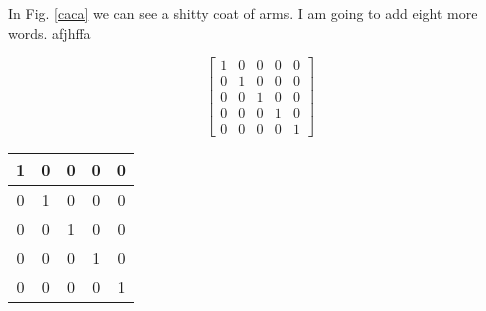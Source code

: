 In Fig. \ref{caca} we can see a shitty coat of arms. I am going to add eight more words. afjhffa

\begin{equation}
\label{equ:prova}
\left[\begin{array}{ccccc}1 & 0 & 0 & 0 & 0 \\0 & 1 & 0 & 0 & 0 \\0 & 0 & 1 & 0 & 0 \\0 & 0 & 0 & 1 & 0 \\0 & 0 & 0 & 0 & 1\end{array}\right]
\end{equation}

\begin{centering}
\begin{tabular}{|c|c|c|c|c|}\hline 1 & 0 & 0 & 0 & 0 \\\hline 0 & 1 & 0 & 0 & 0 \\\hline 0 & 0 & 1 & 0 & 0 \\\hline 0 & 0 & 0 & 1 & 0 \\\hline 0 & 0 & 0 & 0 & 1 \\\hline \end{tabular}
\end{centering}
